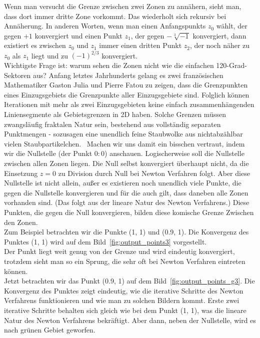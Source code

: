 \documentclass[a4paper,12pt]{llncs}
\numberwithin{equation}{section}
\begin{document}
Wenn man versucht die Grenze zwischen zwei Zonen zu annähern, sieht man, dass dort immer dritte Zone vorkommt. 
Das wiederholt sich rekursiv bei Annäherung.
In anderen Worten, wenn man einen Anfangspunkts $z_0$ wählt, der gegen $+1$ konvergiert und einen Punkt $z_1$, der gegen  $-\sqrt[3]{-1}$ konvergiert, dann existiert es zwischen $z_0$ und $z_1$ immer einen dritten Punkt $z_2$, der noch näher zu $z_0$ als $z_1$ liegt und zu $(-1)^{2/3}$ konvergiert. \\
Wichtigste Frage ist: warum sehen die Zonen nicht wie die einfachen 120-Grad-Sektoren aus?
Anfang letztes Jahrhunderts gelang es zwei französischen Mathematiker Gaston Julia und Pierre Fatou zu zeigen, dass die Grenzpunkten eines Einzugsgebiets die Grenzpunkte aller Einzugsgebiete sind. 
Folglich können Iterationen mit mehr als zwei Einzugsgebieten keine einfach zusammenhängenden Liniensegmente als Gebietsgrenzen in 2D haben. 
Solche Grenzen müssen zwangsläufig fraktalen Natur sein, bestehend aus vollständig separaten Punktmengen - sozusagen eine unendlich feine Staubwolke aus nichtabzählbar vielen Staubpartikelchen.~\cite{frak_cha}
Machen wir uns damit ein bisschen vertraut, indem wir die Nullstelle (der Punkt $0:0$) anschauen.
Logischerweise soll die Nullstelle zwischen allen Zonen liegen.
Die Null selbst konvergiert überhaupt nicht, da die Einsetzung $z=0$ zu Division durch Null bei Newton Verfahren folgt.
Aber diese Nullstelle ist nicht allein, außer es existieren noch unendlich viele Punkte, die gegen die Nullstelle konvergieren und für die auch gilt, dass daneben alle Zonen vorhanden sind.
(Das folgt aus der lineare Natur des Newton Verfahrens.)
Diese Punkten, die gegen die Null konvergieren, bilden diese komische Grenze Zwischen den Zonen.\\
Zum Beispiel betrachten wir die Punkte (1, 1) und (0.9, 1). 
Die Konvergenz des Punktes (1, 1) wird auf dem Bild~\ref{fig:output_points3} vorgestellt.\\
Der Punkt liegt weit genug von der Grenze und wird eindeutig konvergiert, trotzdem sieht man so ein Sprung, die sehr oft bei Newton Verfahren eintreten können.\\
Jetzt betrachten wir das Punkt (0.9, 1) auf dem Bild~\ref{fig:output_points_g3}.
Die Konvergenz des Punktes zeigt eindeutig, wie die iterative Schritte des Newton Verfahrens funktionieren und wie man zu solchen Bildern kommt. 
Erste zwei iterative Schritte behalten sich gleich wie bei dem Punkt (1, 1), was die lineare Natur des Newton Verfahrens bekräftigt. 
Aber dann, neben der Nullstelle, wird es nach grünen Gebiet geworfen.
\end{document}
